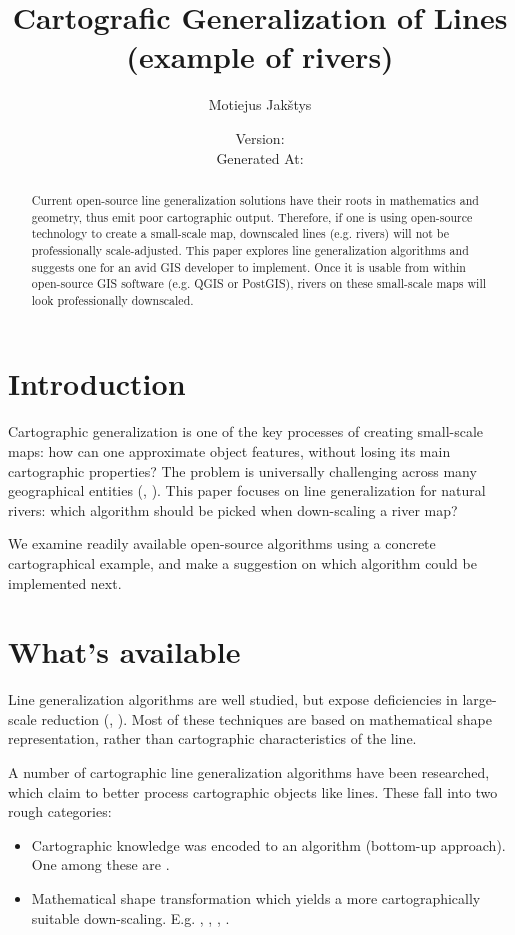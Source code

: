 \documentclass[a4paper]{article}
\title{
    Cartografic Generalization of Lines \\
    (example of rivers) \\ \vspace{4mm}
}
\author{Motiejus Jakštys}
\date{
    \vspace{10mm}
    Version: \VCDescribe \\ \vspace{4mm}
    Generated At: \GeneratedAt
}
\begin{document}
\maketitle

\begin{abstract}
\label{sec:abstract}
Current open-source line generalization solutions have their roots in
mathematics and geometry, thus emit poor cartographic output. Therefore, if one
is using open-source technology to create a small-scale map, downscaled lines
(e.g. rivers) will not be professionally scale-adjusted. This paper explores
line generalization algorithms and suggests one for an avid GIS developer to
implement. Once it is usable from within open-source GIS software (e.g. QGIS or
PostGIS), rivers on these small-scale maps will look professionally downscaled.
\end{abstract}

\newpage

\tableofcontents
\listoffigures

\section{Introduction}
\label{sec:introduction}

Cartographic generalization is one of the key processes of creating small-scale
maps: how can one approximate object features, without losing its main
cartographic properties? The problem is universally challenging across many
geographical entities (\cite{muller1991generalization},
\cite{mcmaster1992generalization}). This paper focuses on line generalization
for natural rivers: which algorithm should be picked when down-scaling a river
map?

We examine readily available open-source algorithms using a concrete
cartographical example, and make a suggestion on which algorithm could be
implemented next.

\section{What's available}

Line generalization algorithms are well studied, but expose deficiencies in
large-scale reduction (\cite{monmonier1986toward}, \cite{mcmaster1993spatial}).
Most of these techniques are based on mathematical shape representation, rather
than cartographic characteristics of the line.

A number of cartographic line generalization algorithms have been researched,
which claim to better process cartographic objects like lines. These fall into
two rough categories:
\begin{itemize}
    \item Cartographic knowledge was encoded to an algorithm (bottom-up
        approach). One among these are \cite{wang1998line}.
    \item Mathematical shape transformation which yields a more
        cartographically suitable down-scaling. E.g. \cite{jiang2003line},
        \cite{dyken2009simultaneous}, \cite{mustafa2006dynamic},
        \cite{nollenburg2008morphing}.
\end{itemize}
\end{document}
